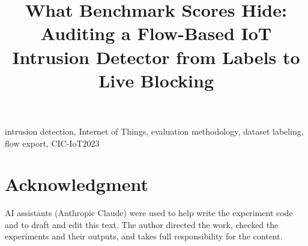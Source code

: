 \documentclass[conference]{IEEEtran}
\begin{document}
\title{What Benchmark Scores Hide: Auditing a Flow-Based IoT Intrusion Detector from Labels to Live Blocking}

\author{
}

\maketitle

\begin{abstract}

\end{abstract}

\begin{IEEEkeywords}
intrusion detection, Internet of Things, evaluation methodology, dataset labeling, flow export, CIC-IoT2023
\end{IEEEkeywords}










\section*{Acknowledgment}
AI assistants (Anthropic Claude) were used to help write the experiment code and to draft and
edit this text. The author directed the work, checked the experiments and their outputs, and takes
full responsibility for the content.



\end{document}
